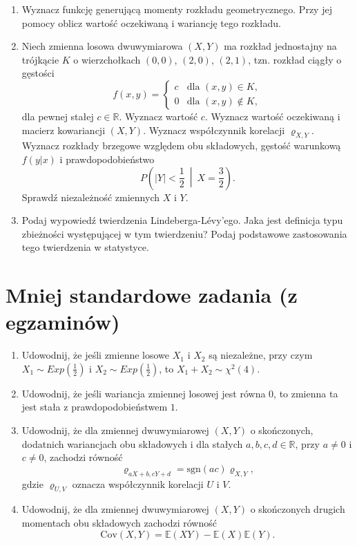 \documentclass[polish]{article}
\begin{document}
\begin{enumerate}
\begin{verbatim}
##
## One Sample t-test
##
## data:  x
## t = -1.908, df = 99, p-value = 0.05929
## alternative hypothesis: true mean is not equal to 1
## 95 percent confidence interval:
##  -0.8244266  1.0357342
## sample estimates:
## mean of x
## 0.1056538
\end{verbatim}
\item Wyznacz funkcję generującą momenty rozkładu geometrycznego. Przy jej pomocy oblicz wartość oczekiwaną i wariancję tego rozkładu.
\item Niech zmienna losowa dwuwymiarowa $(X, Y)$ ma rozkład jednostajny na trójkącie $K$ o wierzchołkach $(0, 0)$, $(2, 0)$, $(2, 1)$, tzn. rozkład ciągły o gęstości
\[
f(x, y) =
\begin{cases} 
c & \text{dla } (x, y) \in K, \\
0 & \text{dla } (x, y) \notin K,
\end{cases}
\]
dla pewnej stałej $c \in \mathbb{R}$. Wyznacz wartość $c$. Wyznacz wartość oczekiwaną i macierz kowariancji $(X, Y)$. Wyznacz współczynnik korelacji $\varrho_{X,Y}$. Wyznacz rozkłady brzegowe względem obu składowych, gęstość warunkową $f(y|x)$ i prawdopodobieństwo
\[
P\left( |Y| < \frac{1}{2} \ \middle| \ X = \frac{3}{2} \right).
\]
Sprawdź niezależność zmiennych $X$ i $Y$.

\item Podaj wypowiedź twierdzenia Lindeberga-Lévy'ego. Jaka jest definicja typu zbieżności występującej w tym twierdzeniu? Podaj podstawowe zastosowania tego twierdzenia w statystyce.

\end{enumerate}

\section{Mniej standardowe zadania (z egzaminów)}
\begin{enumerate}
\item Udowodnij, że jeśli zmienne losowe $X_1$ i $X_2$ są niezależne, przy czym $X_1 \sim Exp\left(\frac{1}{2}\right)$ i $X_2 \sim Exp\left(\frac{1}{2}\right)$, to $X_1 + X_2 \sim \chi^2(4)$.

\item Udowodnij, że jeśli wariancja zmiennej losowej jest równa $0$, to zmienna ta jest stała z prawdopodobieństwem $1$.
\item Udowodnij, że dla zmiennej dwuwymiarowej \((X, Y)\) o skończonych, dodatnich wariancjach obu składowych i dla stałych \(a, b, c, d \in \mathbb{R}\), przy \(a \neq 0\) i \(c \neq 0\), zachodzi równość
\[
\varrho_{aX+b, cY+d} = \mathrm{sgn}(ac) \varrho_{X, Y},
\]
gdzie \(\varrho_{U, V}\) oznacza współczynnik korelacji \(U\) i \(V\).
\item Udowodnij, że dla zmiennej dwuwymiarowej \((X, Y)\) o skończonych drugich momentach obu składowych zachodzi równość
\[
\text{Cov}(X, Y) = \mathbb{E}(XY) - \mathbb{E}(X)\mathbb{E}(Y).
\] 

\end{enumerate}
\end{document}
